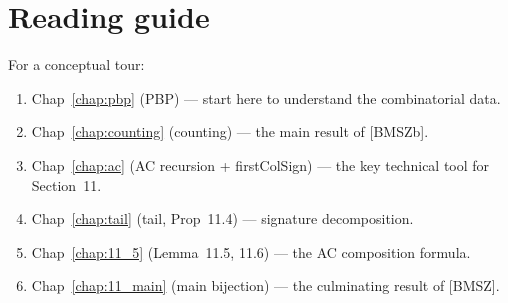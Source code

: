 \section{Reading guide}

For a conceptual tour:
\begin{enumerate}
  \item Chap~\ref{chap:pbp} (PBP) — start here to understand the combinatorial data.
  \item Chap~\ref{chap:counting} (counting) — the main result of [BMSZb].
  \item Chap~\ref{chap:ac} (AC recursion + firstColSign) — the key technical tool for Section~11.
  \item Chap~\ref{chap:tail} (tail, Prop~11.4) — signature decomposition.
  \item Chap~\ref{chap:11_5} (Lemma~11.5, 11.6) — the AC composition formula.
  \item Chap~\ref{chap:11_main} (main bijection) — the culminating result of [BMSZ].
\end{enumerate}
